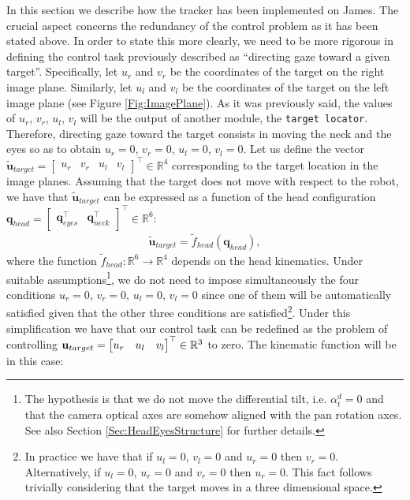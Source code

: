 In this section we describe how the tracker has been implemented on James. The crucial aspect concerns the redundancy of the control problem as it has been stated above. In order to state this more clearly, we need to be more rigorous in defining the control task previously described as ``directing gaze toward a given target''. Specifically, let $u_r$ and $v_r$ be the coordinates of the target on the right image plane. Similarly, let $u_l$ and $v_l$ be the coordinates of the target on the left image plane (see Figure \ref{Fig:ImagePlane}). As it was previously said, the values of $u_r$, $v_r$, $u_l$, $v_l$ will be the output of another module, the {\tt target locator}. Therefore, directing gaze toward the target consists in moving the neck and the eyes so as to obtain $u_r=0$, $v_r=0$, $u_l=0$, $v_l=0$. Let us define the vector $\tilde {\mathbf u}_{target}= \begin{bmatrix} u_r & v_r & u_l & v_l \end{bmatrix}^\top \in \mathbb R^4$ corresponding to the target location in the image planes. Assuming that the target does not move with respect to the robot, we have that $\tilde {\mathbf u}_{target}$ can be expressed as a function of the head configuration $\mathbf q_{head} = \begin{bmatrix} \mathbf q_{eyes}^\top & \mathbf q_{neck}^\top \end{bmatrix}^\top \in \mathbb R^6$:
\begin{eqnarray*}
\tilde {\mathbf u}_{target} = \tilde f_{head} (\mathbf q_{head}),
\end{eqnarray*}
where the function $\tilde f_{head} : \mathbb R^6 \longrightarrow \mathbb R^4$ depends on the head kinematics. Under suitable assumptions\footnote{The hypothesis is that we do not move the differential tilt, i.e. $\alpha_t^d = 0$ and that the camera optical axes are somehow aligned with the pan rotation axes. See also Section \ref{Sec:HeadEyesStructure} for further details.}, we do not need to impose simultaneously the four conditions $u_r=0$, $v_r=0$, $u_l=0$, $v_l=0$ since one of them will be automatically satisfied given that the other three conditions are satisfied\footnote{In practice we have that if $u_l=0$, $v_l=0$ and $u_r=0$ then $v_r=0$. Alternatively, if $u_l=0$, $u_r=0$ and $v_r=0$ then $u_r=0$. This fact follows trivially considering that the target moves in a three dimensional space.}. Under this simplification we have that our control task can be redefined as the problem of controlling $\mathbf{u}_{target} = \begin{bmatrix} u_r & u_l & v_l \end{bmatrix}^\top \in \mathbb R^3$ to zero. The kinematic function will be in this case:
